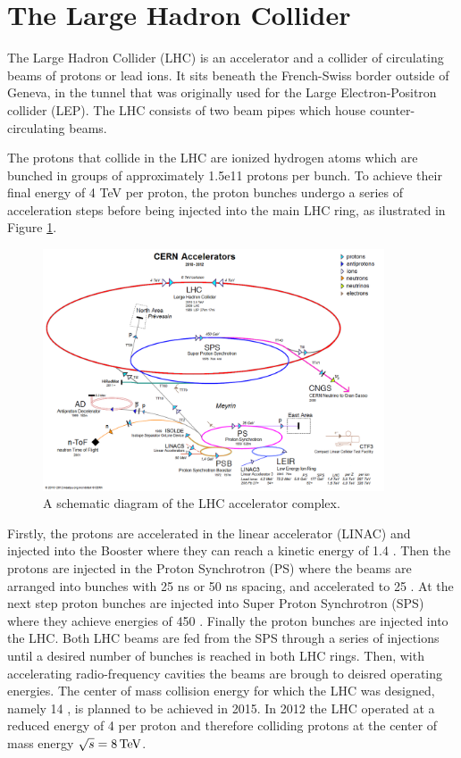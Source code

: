 \section{The Large Hadron Collider}

The Large Hadron Collider (LHC) \cite{Evans:2008zzb,Bruning:2004ej} is an accelerator and a collider of circulating beams of protons
or lead ions. 
It sits beneath the French-Swiss border outside of Geneva, in the tunnel that was originally used
for the Large Electron-Positron collider (LEP). 
 The LHC consists of two beam pipes which house counter-circulating beams.

The protons that collide in the LHC are ionized hydrogen atoms which are bunched in groups
of approximately 1.5e11 protons per bunch. To achieve their final energy of 4 TeV per proton,
the proton bunches undergo a series of acceleration steps before being injected into
the main LHC ring, as ilustrated in Figure \ref{fig:accelerators}.

\begin{figure}[htbp]
\centering
\includegraphics[width=0.9\textwidth]{plots/intro/accelerators.png}
\caption{A schematic diagram of the LHC accelerator complex.\label{fig:accelerators}}
\end{figure}

Firstly, the protons are accelerated in the linear accelerator (LINAC) and injected into 
the Booster where they can reach a kinetic energy of 1.4 \GeV. Then the protons are injected
in the Proton Synchrotron (PS) where the beams are arranged into bunches
with 25 ns or 50 ns spacing, and accelerated to 25 \GeV. At the next step
 proton bunches are injected
into Super Proton Synchrotron (SPS) where they achieve energies of 450 \GeV. Finally the proton
bunches are injected into the LHC. Both LHC beams are fed from the SPS through a series of injections
until a desired number of bunches is reached in both LHC rings. Then, with accelerating 
radio-frequency cavities the beams are brough to deisred operating energies.
The center of mass collision energy for which the LHC was designed, namely 14 \TeV,
 is planned to be achieved in 2015.
In 2012 the LHC operated at a reduced energy of 4 \TeV per proton
and therefore colliding protons at the
center of mass energy $\sqrt{s} = 8 \,\text{Te\hspace{-.08em}V}$.

